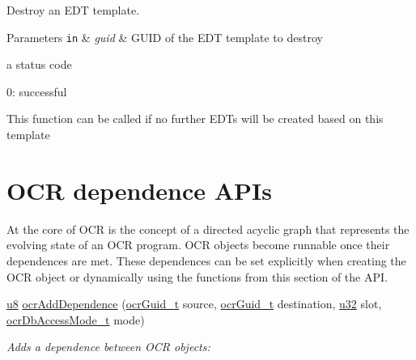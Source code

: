 Destroy an E\-D\-T template.


\begin{DoxyParams}[1]{Parameters}
\mbox{\tt in}  & {\em guid} & G\-U\-I\-D of the E\-D\-T template to destroy \\
\hline
\end{DoxyParams}

\returns
a status code
\begin{DoxyItemize}
\item 0\-: successful
\end{DoxyItemize}

\descr
This function can be called if no further E\-D\-Ts will be created based on this template



\hypertarget{group__OCRDependences}{\section{O\-C\-R dependence A\-P\-Is}
\label{group__OCRDependences}
}

At the core of OCR is the concept of a directed acyclic graph that represents the evolving
state of an OCR program.   OCR objects become runnable once their dependences are met.
These dependences can be set explicitly when creating the OCR object or dynamically using the functions
from this section of the API.


\begin{DoxyCompactItemize}
\item
\hyperlink{group__OCRTypesGeneral_ga92c50087ca0e64fa93fc59402c55f8ca}{u8} \hyperlink{group__OCRDependences_gab0eea439797c1dcde2dbbe704d701dcd}
{ocr\-Add\-Dependence} (\hyperlink{group__OCRTypesGeneral_gacde3883d1ce245c051133c2c3aa82fc8}{ocr\-Guid\-\_\-t} source, \hyperlink{group__OCRTypesGeneral_gacde3883d1ce245c051133c2c3aa82fc8}{ocr\-Guid\-\_\-t} destination, \hyperlink{group__OCRTypesGeneral_gafaa62991928fb9fb18ff0db62a040aba}{u32} slot, \hyperlink{group__OCRTypesDB_gae72c588a0182fcee7db295e53743821a}{ocr\-Db\-Access\-Mode\-\_\-t} mode)
\begin{DoxyCompactList}\small\item\em Adds a dependence between O\-C\-R objects\-: \end{DoxyCompactList}
\end{DoxyCompactItemize}

